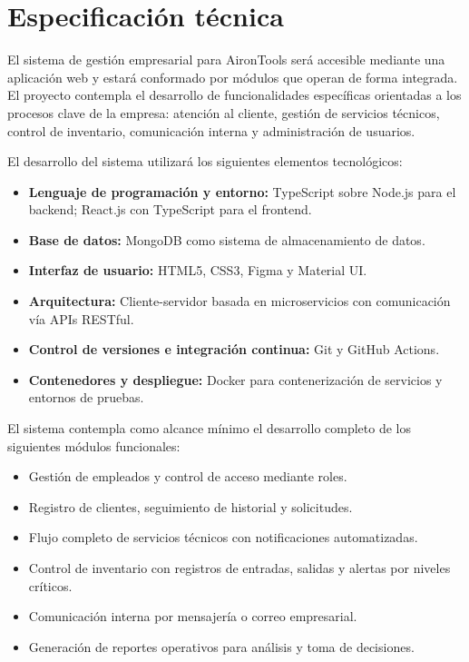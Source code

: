 	\section{Especificación técnica}

	El sistema de gestión empresarial para AironTools será accesible mediante una aplicación web y estará conformado por módulos que operan de forma integrada. El proyecto contempla el desarrollo de funcionalidades específicas orientadas a los procesos clave de la empresa: atención al cliente, gestión de servicios técnicos, control de inventario, comunicación interna y administración de usuarios.
	
	El desarrollo del sistema utilizará los siguientes elementos tecnológicos:
	\begin{itemize}
		\item \textbf{Lenguaje de programación y entorno:} TypeScript sobre Node.js para el backend; React.js con TypeScript para el frontend.
		\item \textbf{Base de datos:} MongoDB como sistema de almacenamiento de datos.
		\item \textbf{Interfaz de usuario:} HTML5, CSS3, Figma y Material UI.
		\item \textbf{Arquitectura:} Cliente-servidor basada en microservicios con comunicación vía APIs RESTful.
		\item \textbf{Control de versiones e integración continua:} Git y GitHub Actions.
		\item \textbf{Contenedores y despliegue:} Docker para contenerización de servicios y entornos de pruebas.
	\end{itemize}
	
	El sistema contempla como alcance mínimo el desarrollo completo de los siguientes módulos funcionales:
	
	\begin{itemize}
		\item Gestión de empleados y control de acceso mediante roles.
		\item Registro de clientes, seguimiento de historial y solicitudes.
		\item Flujo completo de servicios técnicos con notificaciones automatizadas.
		\item Control de inventario con registros de entradas, salidas y alertas por niveles críticos.
		\item Comunicación interna por mensajería o correo empresarial.
		\item Generación de reportes operativos para análisis y toma de decisiones.
	\end{itemize}
	
